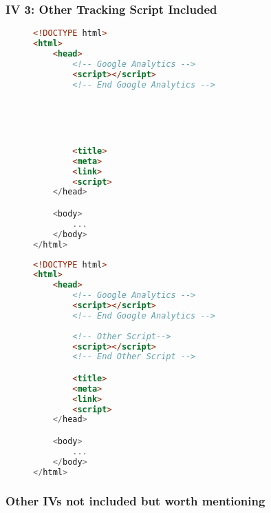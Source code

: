 
\subsubsection{IV 3: Other Tracking Script Included}


\begin{sidewaysfigure}
\begin{multicols}{2}
\begin{center}
\begin{lstlisting}[caption={Other Script 1}, language=html, numbers=none]
<!DOCTYPE html>
<html>
    <head>
        <!-- Google Analytics -->
        <script></script>
        <!-- End Google Analytics -->
        




        <title>
        <meta>
        <link>
        <script>
    </head>

    <body>
        ...
    </body>
</html>
\end{lstlisting}
\end{center}

\columnbreak

\begin{center}
\begin{lstlisting}[caption={Other Script 2}, language=html, numbers=none]
<!DOCTYPE html>
<html>
    <head>
        <!-- Google Analytics -->
        <script></script>
        <!-- End Google Analytics -->
        
        <!-- Other Script-->
        <script></script>
        <!-- End Other Script -->

        <title>
        <meta>
        <link>
        <script>
    </head>

    <body>
        ...
    </body>
</html>
\end{lstlisting}
\end{center}
\end{multicols}
\end{sidewaysfigure}



\subsubsection{Other IVs not included but worth mentioning}



